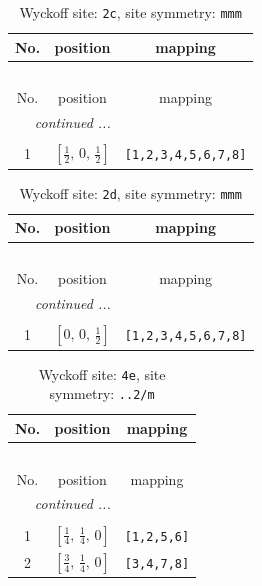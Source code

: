 \documentclass[fleqn,8pt]{jsarticle}
\begin{document}
\begin{longtable}{ccc}
\caption{Wyckoff site: {\tt 2c}, site symmetry: {\tt mmm}}
 \\
 \hline \hline
No. & position & mapping \\ \hline \endfirsthead

\multicolumn{2}{l}{\tablename\ \thetable{}} \\
 \hline \hline
No. & position & mapping \\ \hline \endhead

 \hline \hline
\multicolumn{2}{r}{\footnotesize\it continued ...} \\ \endfoot

 \hline \hline
\multicolumn{2}{r}{} \\ \endlastfoot

1 & $\left[ \frac{1}{2},\, 0,\, \frac{1}{2} \right]$ & {\tt [1,2,3,4,5,6,7,8]} \\
\end{longtable}
\renewcommand{\arraystretch}{1.2}
\begin{longtable}{ccc}
\caption{Wyckoff site: {\tt 2d}, site symmetry: {\tt mmm}}
 \\
 \hline \hline
No. & position & mapping \\ \hline \endfirsthead

\multicolumn{2}{l}{\tablename\ \thetable{}} \\
 \hline \hline
No. & position & mapping \\ \hline \endhead

 \hline \hline
\multicolumn{2}{r}{\footnotesize\it continued ...} \\ \endfoot

 \hline \hline
\multicolumn{2}{r}{} \\ \endlastfoot

1 & $\left[ 0,\, 0,\, \frac{1}{2} \right]$ & {\tt [1,2,3,4,5,6,7,8]} \\
\end{longtable}
\renewcommand{\arraystretch}{1.2}
\begin{longtable}{ccc}
\caption{Wyckoff site: {\tt 4e}, site symmetry: {\tt ..2/m}}
 \\
 \hline \hline
No. & position & mapping \\ \hline \endfirsthead

\multicolumn{2}{l}{\tablename\ \thetable{}} \\
 \hline \hline
No. & position & mapping \\ \hline \endhead

 \hline \hline
\multicolumn{2}{r}{\footnotesize\it continued ...} \\ \endfoot

 \hline \hline
\multicolumn{2}{r}{} \\ \endlastfoot

1 & $\left[ \frac{1}{4},\, \frac{1}{4},\, 0 \right]$ & {\tt [1,2,5,6]} \\ \hline
2 & $\left[ \frac{3}{4},\, \frac{1}{4},\, 0 \right]$ & {\tt [3,4,7,8]} \\
\end{longtable}
\end{document}
